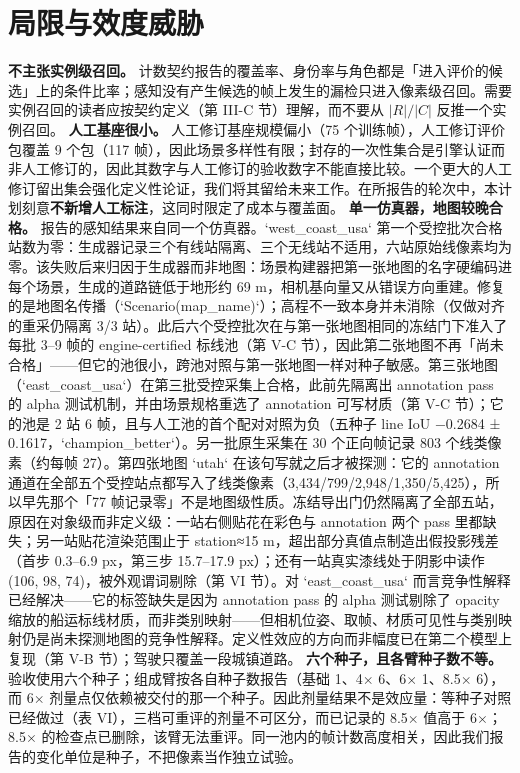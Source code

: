 \documentclass[journal]{IEEEtran}
\begin{document}
\section{局限与效度威胁}
\textbf{不主张实例级召回。} 计数契约报告的覆盖率、身份率与角色都是「进入评价的候选」上的条件比率；感知没有产生候选的帧上发生的漏检只进入像素级召回。需要实例召回的读者应按契约定义（第 III-C 节）理解，而不要从 $|R|/|C|$ 反推一个实例召回。
\textbf{人工基座很小。} 人工修订基座规模偏小（75 个训练帧），人工修订评价包覆盖 9 个包（117 帧），因此场景多样性有限；封存的一次性集合是引擎认证而非人工修订的，因此其数字与人工修订的验收数字不能直接比较。一个更大的人工修订留出集会强化定义性论证，我们将其留给未来工作。在所报告的轮次中，本计划刻意\textbf{不新增人工标注}，这同时限定了成本与覆盖面。
\textbf{单一仿真器，地图较晚合格。} 报告的感知结果来自同一个仿真器。`west_coast_usa` 第一个受控批次合格站数为零：生成器记录三个有线站隔离、三个无线站不适用，六站原始线像素均为零。该失败后来归因于生成器而非地图：场景构建器把第一张地图的名字硬编码进每个场景，生成的道路链低于地形约 69 m，相机基向量又从错误方向重建。修复的是地图名传播（`Scenario(map_name)`）；高程不一致本身并未消除（仅做对齐的重采仍隔离 3/3 站）。此后六个受控批次在与第一张地图相同的冻结门下准入了每批 3--9 帧的 engine-certified 标线池（第 V-C 节），因此第二张地图不再「尚未合格」------但它的池很小，跨池对照与第一张地图一样对种子敏感。第三张地图（`east_coast_usa`）在第三批受控采集上合格，此前先隔离出 annotation pass 的 alpha 测试机制，并由场景规格重选了 annotation 可写材质（第 V-C 节）；它的池是 2 站 6 帧，且与人工池的首个配对对照为负（五种子 line IoU −0.2684 ± 0.1617，`champion_better`）。另一批原生采集在 30 个正向帧记录 803 个线类像素（约每帧 27）。第四张地图 `utah` 在该句写就之后才被探测：它的 annotation 通道在全部五个受控站点都写入了线类像素（3,434/799/2,948/1,350/5,425），所以早先那个「77 帧记录零」不是地图级性质。冻结导出门仍然隔离了全部五站，原因在对象级而非定义级：一站右侧贴花在彩色与 annotation 两个 pass 里都缺失；另一站贴花渲染范围止于 station≈15 m，超出部分真值点制造出假投影残差（首步 0.3--6.9 px，第三步 15.7--17.9 px）；还有一站真实漆线处于阴影中读作 (106, 98, 74)，被外观谓词剔除（第 VI 节）。对 `east_coast_usa` 而言竞争性解释已经解决------它的标签缺失是因为 annotation pass 的 alpha 测试剔除了 opacity 缩放的船运标线材质，而非类别映射------但相机位姿、取帧、材质可见性与类别映射仍是尚未探测地图的竞争性解释。定义性效应的方向而非幅度已在第二个模型上复现（第 V-B 节）；驾驶只覆盖一段城镇道路。
\textbf{六个种子，且各臂种子数不等。} 验收使用六个种子；组成臂按各自种子数报告（基础 1、4$\times$ 6、6$\times$ 1、8.5$\times$ 6），而 6$\times$ 剂量点仅依赖被交付的那一个种子。因此剂量结果不是效应量：等种子对照已经做过（表 VI），三档可重评的剂量不可区分，而已记录的 8.5$\times$ 值高于 6$\times$；8.5$\times$ 的检查点已删除，该臂无法重评。同一池内的帧计数高度相关，因此我们报告的变化单位是种子，不把像素当作独立试验。
\end{document}

